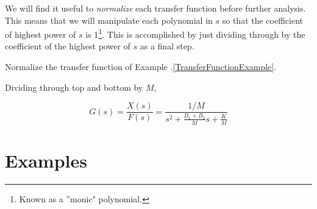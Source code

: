 We will find it useful to {\it normalize} each transfer function before further analysis.   This means that we will manipulate each polynomial in $s$ so that the coefficient of  highest power of $s$ is 1\footnote{Known as a ''monic" polynomial.}.    This is accomplished by just dividing through by the coefficient of the highest power of $s$ as a final step.


\begin{ExampleSmall}
Normalize the transfer function of Example \thechapter.\ref{TransferFunctionExample}.

Dividing through top and bottom by $M$,

\[
G(s) = \frac {X(s)}{F(s)} = \frac {1/M}{s^2 + \frac{B_1+B_2}{M}s + \frac{K}{M} }
\]
\end{ExampleSmall}


\section{Examples}

